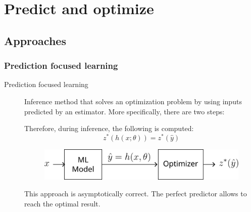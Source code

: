 \chapter{Predict and optimize}


\section{Approaches}


\subsection{Prediction focused learning}

\begin{description}
    \item[Prediction focused learning] 
        Inference method that solves an optimization problem by using inputs predicted by an estimator. More specifically, there are two steps:

        Therefore, during inference, the following is computed:
        \[ z^*(h(x; \theta)) = z^*(\hat{y}) \]

        \begin{figure}[H]
            \centering
            \includegraphics[width=0.5\linewidth]{./img/dfl_setup.png}
        \end{figure}

        \begin{remark}
            This approach is asymptotically correct. The perfect predictor allows to reach the optimal result.
        \end{remark}


\end{description}
